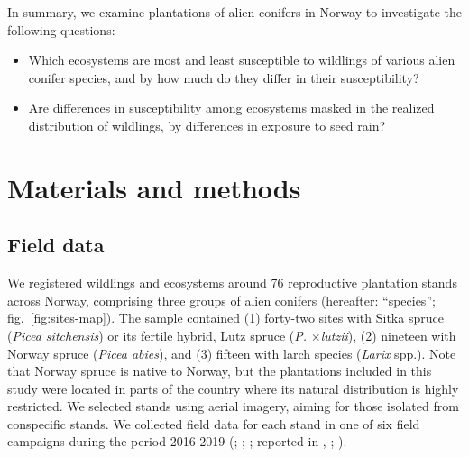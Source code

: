 \documentclass[
]{article}
\providecommand{\tightlist}{%
  \setlength{\itemsep}{0pt}\setlength{\parskip}{0pt}}
\begin{document}
In summary, we examine plantations of alien conifers in Norway to investigate
the following questions:

\begin{itemize}
\tightlist
\item
  Which ecosystems are most and least susceptible to wildlings of various
  alien conifer species, and by how much do they differ in their
  susceptibility?
\item
  Are differences in susceptibility among ecosystems masked in the realized
  distribution of wildlings, by differences in exposure to seed rain?
\end{itemize}

\section{Materials and methods}\label{materials-and-methods}

\subsection{Field data}\label{field-data}

We registered wildlings and ecosystems around 76 reproductive plantation stands
across Norway, comprising three groups of alien conifers (hereafter: ``species'';
fig.~\ref{fig:sites-map}). The sample contained (1) forty-two sites with Sitka
spruce (\emph{Picea sitchensis}) or its fertile hybrid, Lutz spruce (\emph{P.}
\(\times\)\emph{lutzii}), (2) nineteen with Norway spruce (\emph{Picea abies}), and (3)
fifteen with larch species (\emph{Larix} spp.). Note that Norway spruce is native to
Norway, but the plantations included in this study were located in parts of the
country where its natural distribution is highly restricted. We selected stands
using aerial imagery, aiming for those isolated from conspecific stands. We
collected field data for each stand in one of six field campaigns during the
period 2016-2019 (; ; ; reported in , ; ).
\end{document}
